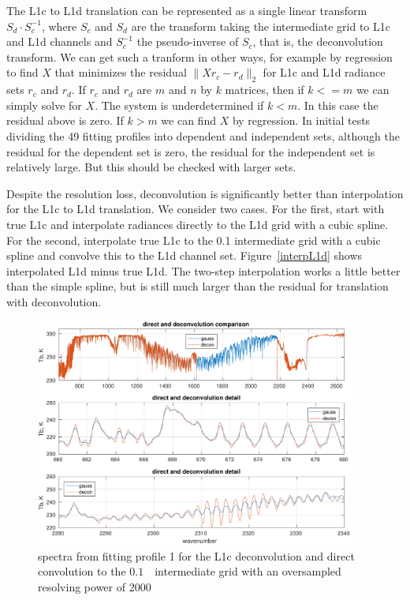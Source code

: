\documentclass[11pt]{article}
\begin{document}
The L1c to L1d translation can be represented as a single linear
transform $S_d\cdot S_c^{-1}$, where $S_c$ and $S_d$ are the
transform taking the intermediate grid to L1c and L1d channels and
$S_c^{-1}$ the pseudo-inverse of $S_c$, that is, the deconvolution
transform.  We can get such a tranform in other ways, for example by
regression to find $X$ that minimizes the residual $\|X r_c -
r_d\|_2$ for L1c and L1d radiance sets $r_c$ and $r_d$.  If $r_c$
and $r_d$ are $m$ and $n$ by $k$ matrices, then if $k <= m$ we can
simply solve for $X$.  The system is underdetermined if $k < m$.  In
this case the residual above is zero.  If $k > m$ we can find $X$ by
regression.  In initial tests dividing the 49 fitting profiles into
dependent and independent sets, although the residual for the
dependent set is zero, the residual for the independent set is
relatively large.  But this should be checked with larger sets.

Despite the resolution loss, deconvolution is significantly better
than interpolation for the L1c to L1d translation.  We consider two
cases.  For the first, start with true L1c and interpolate radiances
directly to the L1d grid with a cubic spline.  For the second,
interpolate true L1c to the 0.1 {\wn} intermediate grid with a cubic
spline and convolve this to the L1d channel set.
Figure~\ref{interpL1d} shows interpolated L1d minus true L1d.  The
two-step interpolation works a little better than the simple spline,
but is still much larger than the residual for translation with
deconvolution.

\begin{figure} %
  \centering
  \includegraphics[height=7.5cm]{figures/airs_decon_spec.pdf}
  \caption{spectra from fitting profile 1 for the L1c deconvolution
    and direct convolution to the $0.1$~\wn\ intermediate grid with
    an oversampled resolving power of 2000}
  \label{dspec}
\end{figure}
\end{document}
